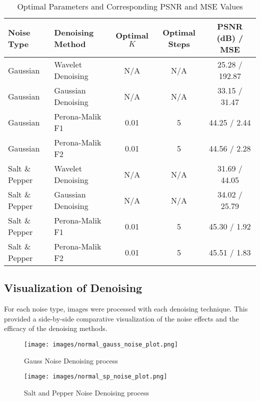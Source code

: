 \documentclass{article}
\begin{document}
\begin{table}[H]
\centering
\caption{Optimal Parameters and Corresponding PSNR and MSE Values}
\label{tab:optimal_parameters}
\begin{tabular}{llccc}
\hline
Noise Type & Denoising Method & Optimal \( K \) & Optimal Steps & PSNR (dB) / MSE \\ \hline
Gaussian & Wavelet Denoising & N/A & N/A & 25.28 / 192.87 \\
Gaussian & Gaussian Denoising & N/A & N/A & 33.15 / 31.47 \\
Gaussian & Perona-Malik F1 & 0.01 & 5 & 44.25 / 2.44 \\
Gaussian & Perona-Malik F2 & 0.01 & 5 & 44.56 / 2.28 \\
Salt \& Pepper & Wavelet Denoising & N/A & N/A & 31.69 / 44.05 \\
Salt \& Pepper & Gaussian Denoising & N/A & N/A & 34.02 / 25.79 \\
Salt \& Pepper & Perona-Malik F1 & 0.01 & 5 & 45.30 / 1.92 \\
Salt \& Pepper & Perona-Malik F2 & 0.01 & 5 & 45.51 / 1.83 \\ \hline
\end{tabular}
\end{table}

\subsection{Visualization of Denoising}
For each noise type, images were processed with each denoising technique. This provided a side-by-side comparative visualization of the noise effects and the efficacy of the denoising methods.

\begin{figure}[H]
    \centering
    \texttt{[image: images/normal\_gauss\_noise\_plot.png]}
    \caption{Gauss Noise Denoising process}
    \label{fig:denoising_1}
\end{figure}

\begin{figure}[H]
    \centering
    \texttt{[image: images/normal\_sp\_noise\_plot.png]}
    \caption{Salt and Pepper Noise Denoising process}
    \label{fig:denoising_2}
\end{figure}

\end{document}
